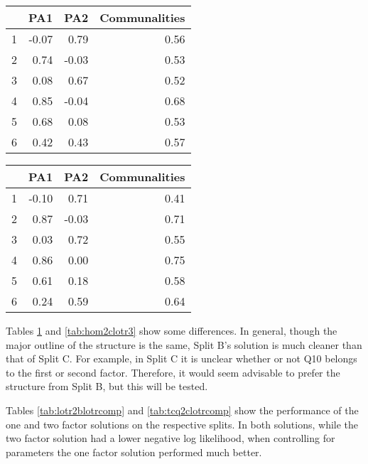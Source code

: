 \documentclass{article}
\begin{document}
\begin{table}[ht]
\centering
\begin{tabular}{rrrr}
  \hline
 & PA1 & PA2 & Communalities \\ 
  \hline
1 & -0.07 & 0.79 & 0.56 \\ 
  2 & 0.74 & -0.03 & 0.53 \\ 
  3 & 0.08 & 0.67 & 0.52 \\ 
  4 & 0.85 & -0.04 & 0.68 \\ 
  5 & 0.68 & 0.08 & 0.53 \\ 
  6 & 0.42 & 0.43 & 0.57 \\ 
   \hline
\end{tabular}
\label{tab:hom2blotr2}
\end{table}
\begin{table}[ht]
\centering
\begin{tabular}{rrrr}
  \hline
 & PA1 & PA2 & Communalities \\ 
  \hline
1 & -0.10 & 0.71 & 0.41 \\ 
  2 & 0.87 & -0.03 & 0.71 \\ 
  3 & 0.03 & 0.72 & 0.55 \\ 
  4 & 0.86 & 0.00 & 0.75 \\ 
  5 & 0.61 & 0.18 & 0.58 \\ 
  6 & 0.24 & 0.59 & 0.64 \\ 
   \hline
\end{tabular}
\label{tab:hom2clotr2}
\end{table}
Tables \ref{tab:hom2blotr2} and \ref{tab:hom2clotr3} show some differences. In general, though the major outline of the structure is the same, Split B's solution is much cleaner than that of Split C. For example, in Split C it is unclear whether or not Q10 belongs to the first or second factor. Therefore, it would seem advisable to prefer the structure from Split B, but this will be tested. 









Tables \ref{tab:lotr2blotrcomp} and \ref{tab:tcq2clotrcomp} show the performance of the one and two factor solutions on the respective splits. In both solutions, while the two factor solution had a lower negative log likelihood, when controlling for parameters the one factor solution performed much better. 
\end{document}
